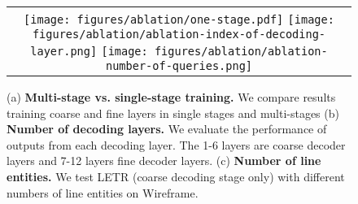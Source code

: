 \documentclass[final]{cvpr}
\begin{document}
\begin{table}[!ht]
\centering
\vspace{-2mm}
\caption{ \small{\textbf{Effectiveness of modules.}} Ablation study of the architecture design and learning aspects in the proposed LETR on Wireframe dataset. (C) indicates the indexed feature used for coarse decoder; (F) indicates the indexed feature used for fine decoder.}
\label{table:role-of-modules}
\vspace{-3mm}
\end{table}

\begin{figure}[!ht]
\begin{center}
\vspace{-2mm}
\begin{tabular}{c}
\hspace{-4mm}\texttt{[image: figures/ablation/one-stage.pdf]}
\texttt{[image: figures/ablation/ablation-index-of-decoding-layer.png]}
\texttt{[image: figures/ablation/ablation-number-of-queries.png]}
\end{tabular}
\caption{\small (a) \textbf{Multi-stage vs. single-stage training.} We compare results training coarse and fine layers in single stages and multi-stages (b) \textbf{Number of decoding layers.} We evaluate the performance of outputs from each decoding layer. The 1-6 layers are coarse decoder layers and 7-12 layers fine decoder layers. (c) \textbf{Number of line entities.} We test LETR (coarse decoding stage only) with different numbers of line entities on Wireframe.}
\vspace{-6mm}
\label{fig:ablation}
\end{center}
\end{figure}
\end{document}
